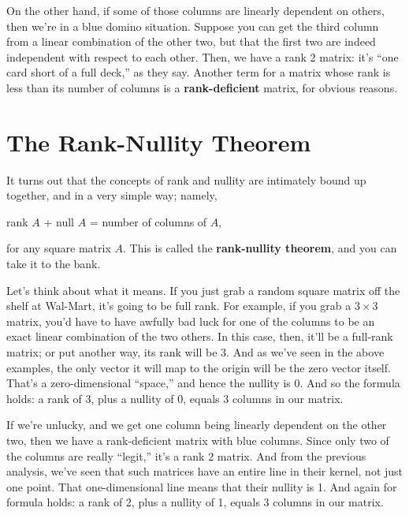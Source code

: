 
On the other hand, if some of those columns are linearly dependent on others,
then we're in a blue domino situation. Suppose you can get the third column
from a linear combination of the other two, but that the first two are indeed
independent with respect to each other. Then, we have a rank 2 matrix: it's
``one card short of a full deck,'' as they say. Another term for a matrix whose
rank is less than its number of columns is a \textbf{rank-deficient} matrix,
for obvious reasons.

\section{The Rank-Nullity Theorem}

It turns out that the concepts of rank and nullity are intimately bound up
together, and in a very simple way; namely,

\vspace{-.15in}
\begin{center}
rank $A$ + null $A$ = number of columns of $A$,
\end{center}
\vspace{-.15in}


for any square matrix $A$. This is called the \textbf{rank-nullity theorem},
and you can take it to the bank.

Let's think about what it means. If you just grab a random square matrix off
the shelf at Wal-Mart, it's going to be full rank. For example, if you grab a
$3\times 3$ matrix, you'd have to have awfully bad luck for one of the columns
to be an exact linear combination of the two others. In this case, then, it'll
be a full-rank matrix; or put another way, its rank will be 3. And as we've
seen in the above examples, the only vector it will map to the origin will be
the zero vector itself. That's a zero-dimensional ``space,'' and hence the
nullity is 0. And so the formula holds: a rank of 3, plus a nullity of 0,
equals 3 columns in our matrix.

If we're unlucky, and we get one column being linearly dependent on the other
two, then we have a rank-deficient matrix with blue columns. Since only two of
the columns are really ``legit,'' it's a rank 2 matrix. And from the previous
analysis, we've seen that such matrices have an entire line in their kernel,
not just one point. That one-dimensional line means that their nullity is 1.
And again for formula holds: a rank of 2, plus a nullity of 1, equals 3 columns
in our matrix.

